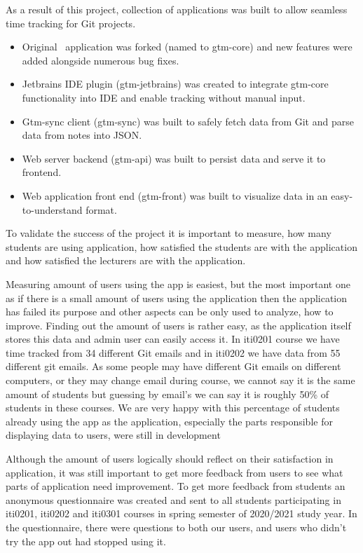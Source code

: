 As a result of this project, collection of applications was built to allow seamless time tracking for Git projects.
\begin{itemize}
    \item Original~ application was forked (named to gtm-core) and new features were added
    alongside numerous bug fixes.
    \item Jetbrains IDE plugin (gtm-jetbrains) was created to integrate gtm-core functionality into IDE and enable tracking without manual input.
    \item Gtm-sync client (gtm-sync) was built to safely fetch data from Git and parse data from notes into JSON.
    \item Web server backend (gtm-api) was built to persist data and serve it to frontend.
    \item Web application front end (gtm-front) was built to visualize data in an easy-to-understand format.
\end{itemize}

To validate the success of the project it is important to measure, how many students are using application,
how satisfied the students are with the application and how satisfied the lecturers are with the application.

Measuring amount of users using the app is easiest, but the most important one as if there is a small amount of users using
the application then the application has failed its purpose and other aspects can be only used to analyze, how
to improve.
Finding out the amount of users is rather easy, as the application itself stores this data and admin user can easily access it.
In iti0201 course we have time tracked from 34 different Git emails and in iti0202 we have data from 55 different git emails.
As some people may have different Git emails on different computers, or they may change email during course, we cannot say it
is the same amount of students but guessing by email's we can say it is roughly 50\% of students in these courses.
We are very happy with this percentage of students already using the app as the application, especially the parts
responsible for displaying data to users, were still in development

Although the amount of users logically should reflect on their satisfaction in application, it was still important to
get more feedback from users to see what parts of application need improvement.
To get more feedback from students an anonymous questionnaire was created and sent to all students participating in iti0201, iti0202
and iti0301 courses in spring semester of 2020/2021 study year.
In the questionnaire, there were questions to both our users, and users who didn't try the app out had stopped using it.

